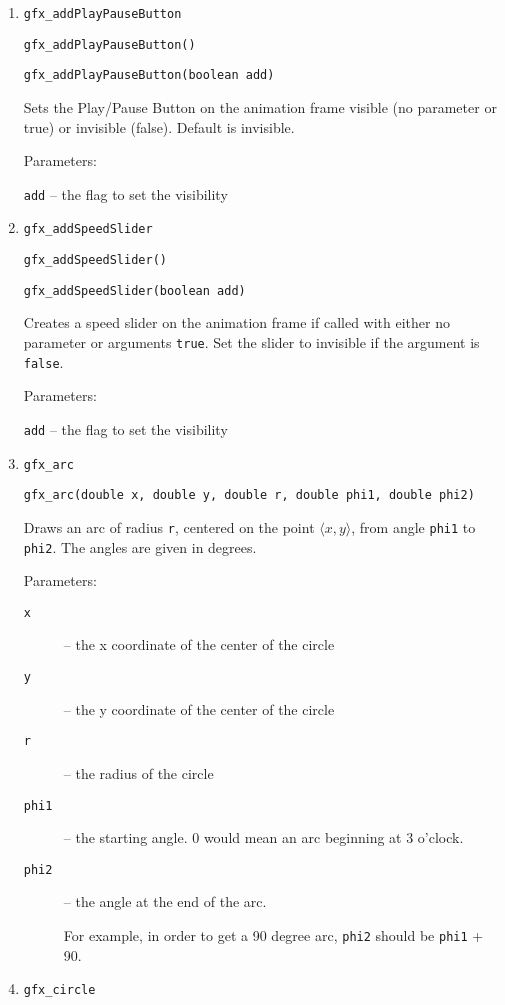 \begin{enumerate}
\item \texttt{gfx\_addPlayPauseButton}

      \texttt{gfx\_addPlayPauseButton()}

      \texttt{gfx\_addPlayPauseButton(boolean add)}

      Sets the Play/Pause Button on the animation frame visible (no
      parameter or true) or invisible (false).   Default is
      invisible. 

      Parameters:

      \texttt{add} -- the flag to set the visibility
\item \texttt{gfx\_addSpeedSlider}

      \texttt{gfx\_addSpeedSlider()}

      \texttt{gfx\_addSpeedSlider(boolean add)}

      Creates a speed slider on the animation frame if called with either no 
      parameter or arguments \texttt{true}.
      Set the slider to invisible if the argument is \texttt{false}. 

      Parameters:

      \texttt{add} -- the flag to set the visibility
\item \texttt{gfx\_arc}

      \texttt{gfx\_arc(double x, double y, double r, double phi1, double phi2)}

      Draws an arc of radius \texttt{r}, centered on the point $\langle x, y \rangle$, 
      from angle \texttt{phi1} to \texttt{phi2}. The angles are given in degrees.

      Parameters:
      \begin{description}
        \item[\texttt{x}] -- the x coordinate of the center of the circle
        \item[\texttt{y}] -- the y coordinate of the center of the circle
        \item[\texttt{r}] -- the radius of the circle
        \item[\texttt{phi1}] -- the starting angle. 0 would mean an arc beginning at 3 o'clock.
        \item[\texttt{phi2}] -- the angle at the end of the arc.  

              For example, in order to get a 90 degree arc, \texttt{phi2} should be
              \texttt{phi1} + 90. 
      \end{description}
\item \texttt{gfx\_circle}


\end{enumerate}
